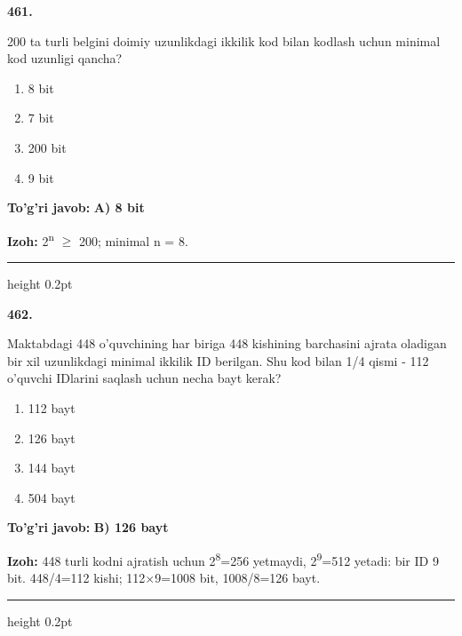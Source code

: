 \documentclass[10pt,a4paper,oneside]{article}
\begin{document}
\noindent\textbf{\color{ink}461.}
\par
200 ta turli belgini doimiy uzunlikdagi ikkilik kod bilan kodlash uchun minimal kod uzunligi qancha?
\begin{enumerate}[label=\Alph*),leftmargin=9mm]
\item 8 bit
\item 7 bit
\item 200 bit
\item 9 bit
\end{enumerate}
\begin{tcolorbox}[enhanced,breakable,colback=teal!4,colframe=teal!50!black,boxrule=0.5pt,arc=1.1mm,left=3mm,right=3mm,top=1.7mm,bottom=1.7mm,before skip=2mm,after skip=2mm]
\textbf{\color{teal}To'g'ri javob:} \textbf{A) 8 bit}
\par\smallskip
\textbf{Izoh:} 2\textsuperscript{n} \ensuremath{\geq} 200; minimal n = 8.
\end{tcolorbox}
\vspace{2mm}\hrule height 0.2pt \vspace{3mm}

\noindent\textbf{\color{ink}462.}
\par
Maktabdagi 448 o'quvchining har biriga 448 kishining barchasini ajrata oladigan bir xil uzunlikdagi minimal ikkilik ID berilgan. Shu kod bilan 1/4 qismi - 112 o'quvchi IDlarini saqlash uchun necha bayt kerak?
\begin{enumerate}[label=\Alph*),leftmargin=9mm]
\item 112 bayt
\item 126 bayt
\item 144 bayt
\item 504 bayt
\end{enumerate}
\begin{tcolorbox}[enhanced,breakable,colback=teal!4,colframe=teal!50!black,boxrule=0.5pt,arc=1.1mm,left=3mm,right=3mm,top=1.7mm,bottom=1.7mm,before skip=2mm,after skip=2mm]
\textbf{\color{teal}To'g'ri javob:} \textbf{B) 126 bayt}
\par\smallskip
\textbf{Izoh:} 448 turli kodni ajratish uchun 2\textsuperscript{8}=256 yetmaydi, 2\textsuperscript{9}=512 yetadi: bir ID 9 bit. 448/4=112 kishi; 112\ensuremath{\times}9=1008 bit, 1008/8=126 bayt.
\end{tcolorbox}
\vspace{2mm}\hrule height 0.2pt \vspace{3mm}
\end{document}
